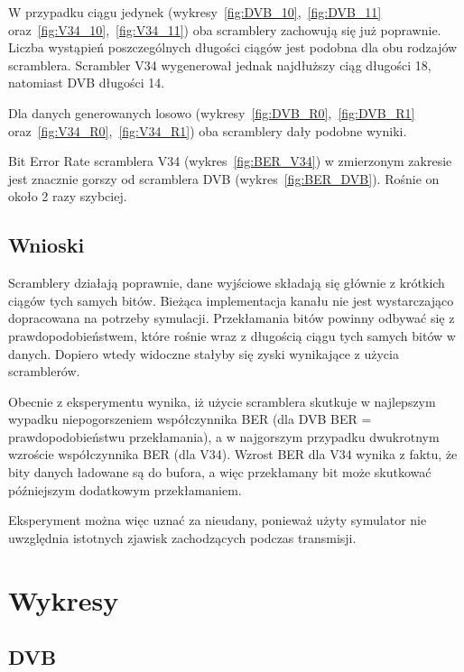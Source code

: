 \documentclass[polish, 11pt]{article}
\begin{document}
        W przypadku ciągu jedynek (wykresy~\ref{fig:DVB_10},~\ref{fig:DVB_11} oraz~\ref{fig:V34_10},~\ref{fig:V34_11}) oba scramblery zachowują się już poprawnie.
        Liczba wystąpień poszczególnych długości ciągów jest podobna dla obu rodzajów scramblera. 
        Scrambler V34 wygenerował jednak najdłuższy ciąg długości 18, natomiast DVB długości 14.

        Dla danych generowanych losowo (wykresy~\ref{fig:DVB_R0},~\ref{fig:DVB_R1} oraz~\ref{fig:V34_R0},~\ref{fig:V34_R1})
        oba scramblery dały podobne wyniki.

        Bit Error Rate scramblera V34 (wykres~\ref{fig:BER_V34}) w zmierzonym zakresie jest znacznie gorszy od scramblera DVB (wykres~\ref{fig:BER_DVB}).
        Rośnie on około 2 razy szybciej.

    \subsection{Wnioski}
        Scramblery działają poprawnie, dane wyjściowe składają się głównie z krótkich ciągów tych samych bitów.
        Bieżąca implementacja kanału nie jest wystarczająco dopracowana na potrzeby symulacji.
        Przekłamania bitów powinny odbywać się z prawdopodobieństwem, które rośnie wraz z długością ciągu tych samych bitów w danych.
        Dopiero wtedy widoczne stałyby się zyski wynikające z użycia scramblerów.
        
        Obecnie z eksperymentu wynika, iż użycie scramblera skutkuje w najlepszym wypadku niepogorszeniem współczynnika BER (dla DVB BER = prawdopodobieństwu przekłamania),
        a w najgorszym przypadku dwukrotnym wzroście współczynnika BER (dla V34).
        Wzrost BER dla V34 wynika z faktu, że bity danych ładowane są do bufora, a więc przekłamany bit może skutkować późniejszym dodatkowym przekłamaniem.

        Eksperyment można więc uznać za nieudany, ponieważ użyty symulator nie uwzględnia istotnych zjawisk zachodzących podczas transmisji.

\newpage
\section{Wykresy}
    \subsection{DVB}
\end{document}

